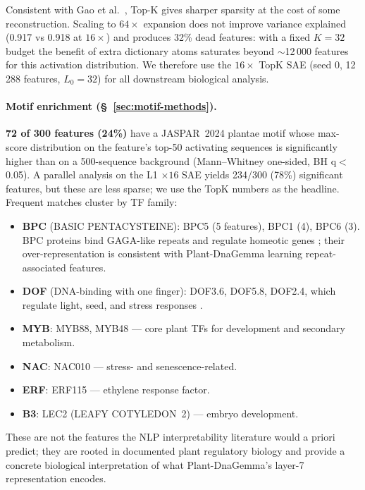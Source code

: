 \documentclass{article}
\begin{document}
Consistent with Gao et al.~\citep{gao2024scaling}, Top-K gives sharper
sparsity at the cost of some reconstruction. Scaling to $64\times$ expansion
does not improve variance explained (0.917 vs 0.918 at $16\times$) and
produces 32\% dead features: with a fixed $K=32$ budget the benefit of
extra dictionary atoms saturates beyond $\sim$12\,000 features for this
activation distribution. We therefore use the $16\times$ TopK SAE
(seed 0, 12\,288 features, $L_0=32$) for all downstream biological analysis.

\paragraph{Motif enrichment (§~\ref{sec:motif-methods}).}
\textbf{72 of 300 features (24\%)} have a JASPAR~2024 plantae motif whose
max-score distribution on the feature's top-50 activating sequences is
significantly higher than on a 500-sequence background (Mann--Whitney
one-sided, BH q$<$0.05). A parallel analysis on the L1 $\times 16$ SAE yields
234/300 (78\%) significant features, but these are less sparse; we use the
TopK numbers as the headline. Frequent matches cluster by TF family:

\begin{itemize}
    \item \textbf{BPC} (BASIC PENTACYSTEINE): BPC5 (5 features), BPC1 (4),
    BPC6 (3). BPC proteins bind GAGA-like repeats and regulate homeotic
    genes \citep{meister2004high}; their over-representation is consistent
    with Plant-DnaGemma learning repeat-associated features.
    \item \textbf{DOF} (DNA-binding with one finger): DOF3.6, DOF5.8,
    DOF2.4, which regulate light, seed, and stress responses
    \citep{yanagisawa2004dof}.
    \item \textbf{MYB}: MYB88, MYB48 --- core plant TFs for development
    and secondary metabolism.
    \item \textbf{NAC}: NAC010 --- stress- and senescence-related.
    \item \textbf{ERF}: ERF115 --- ethylene response factor.
    \item \textbf{B3}: LEC2 (LEAFY COTYLEDON~2) --- embryo development.
\end{itemize}

These are not the features the NLP interpretability literature would
a priori predict; they are rooted in documented plant regulatory biology
and provide a concrete biological interpretation of what Plant-DnaGemma's
layer-7 representation encodes.
\end{document}
